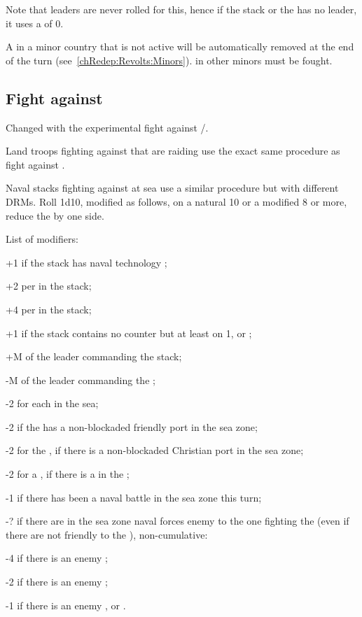 Note that  leaders are never rolled for this, hence if the
stack or the \RevReb has no leader, it uses a \Man of 0.

A \RevReb in a minor country that is not active will be automatically removed
at the end of the turn (see~\ref{chRedep:Revolts:Minors}). \RevReb in other
minors must be fought.

\subsection{Fight against \corsaire}
\label{chMilitary:Corsairs}
\begin{designnote}
  Changed with the experimental fight against \RevReb/\corsaire.
\end{designnote}

Land troops fighting against \corsaire that are raiding use the exact same
procedure as fight against \RevReb.

Naval stacks fighting against \corsaire at sea use a similar procedure but
with different DRMs. Roll 1d10, modified as follows, on a natural 10 or a
modified 8 or more, reduce the \corsaire by one side.

List of modifiers:
\begin{modlist}
\item[+1] if the stack has naval technology \TSF;
\item[+2] per \FLEET\facemoins in the stack;
\item[+4] per \FLEET\faceplus in the stack;
\item[+1] if the stack contains no \FLEET counter but at least on 1\NDE, \NWD
  or \NGD;
\item[+M] \Man of the leader commanding the stack;
\item[-M] \Man of the leader commanding the \corsaire;
\item[-2] for each \corsaire\faceplus in the sea;
\item[-2] if the \corsaire has a non-blockaded friendly port in the sea zone;
\item[-2] for the  \corsaire, if there is a non-blockaded
  Christian port in the sea zone;
\item[-2] for a  \corsaire, if there is a 
  in the \STZ;
\item[-1] if there has been a naval battle in the sea zone this turn;
\item[-?] if there are in the sea zone naval forces enemy to the one fighting
  the \corsaire (even if there are not friendly to the \corsaire),
  non-cumulative:
  \begin{modlisti}
  \item[-4] if there is an enemy \FLEET\faceplus;
  \item[-2] if there is an enemy \FLEET\facemoins;
  \item[-1] if there is an enemy \NDE, \NWD or \NGD.
  \end{modlisti}
\end{modlist}


